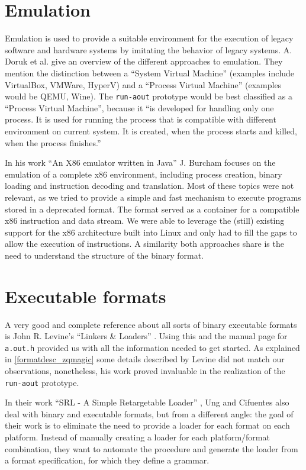 \documentclass[draft,final]{vutinfth} %
\begin{document}
\section{Emulation}

Emulation is used to provide a suitable environment for the execution of legacy software and hardware systems by imitating the behavior of legacy systems. \cite{dorukdesign} A. Doruk et al. give an overview of the different approaches to emulation. They mention the distinction between a ``System Virtual Machine'' (examples include VirtualBox, VMWare, HyperV) and a ``Process Virtual Machine'' (examples would be QEMU, Wine). The \texttt{run-aout} prototype would be best classified as a ``Process Virtual Machine'', because it ``is developed for handling only one process. It is used for running the process that is compatible with different environment on current system. It is created, when the process starts and killed, when the process finishes.'' \cite[2]{dorukdesign}

In his work ``An X86 emulator written in Java'' \cite{JBurcham} J. Burcham focuses on the emulation of a complete x86 environment, including process creation, binary loading and instruction decoding and translation. Most of these topics were not relevant, as we tried to provide a simple and fast mechanism to execute programs stored in a deprecated format. The format served as a container for a compatible x86 instruction and data stream. We were able to leverage the (still) existing support for the x86 architecture built into Linux and only had to fill the gaps to allow the execution of instructions. A similarity both approaches share is the need to understand the structure of the binary format.

\section{Executable formats}

A very good and complete reference about all sorts of binary executable formats is John R. Levine's ``Linkers \& Loaders'' \cite{Levine}. Using this and the manual page for \texttt{a.out.h}\cite{FreeBSDAoutManPage} provided us with all the information needed to get started. As explained in \ref{formatdesc_zqmagic} some details described by Levine did not match our observations, nonetheless, his work proved invaluable in the realization of the \texttt{run-aout} prototype.

In their work ``SRL - A Simple Retargetable Loader'' \cite{DBLP:conf/aswec/UngC97}, Ung and Cifuentes also deal with binary and executable formats, but from a different angle: the goal of their work is to eliminate the need to provide a loader for each format on each platform. Instead of manually creating a loader for each platform/format combination, they want to automate the procedure and generate the loader from a format specification, for which they define a grammar.
\end{document}
